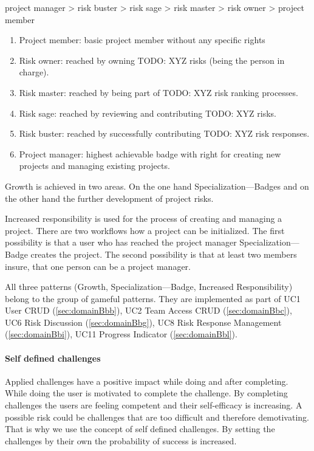 project manager > risk buster > risk sage > risk master > risk owner > project member

\begin{enumerate}
	\item Project member: basic project member without any specific rights
	\item Risk owner: reached by owning TODO: XYZ risks (being the person in charge).
	\item Risk master: reached by being part of TODO: XYZ risk ranking processes.
	\item Risk sage: reached by reviewing and contributing TODO: XYZ risks.
	\item Risk buster: reached by successfully contributing TODO: XYZ risk responses.
	\item Project manager: highest achievable badge with right for creating new projects and managing existing projects.
\end{enumerate}

Growth is achieved in two areas. On the one hand Specialization—Badges and on the other hand the further development of project risks.

Increased responsibility is used for the process of creating and managing a project. There are two workflows how a project can be initialized. The first possibility is that a user who has reached the project manager Specialization—Badge creates the project. The second possibility is that at least two members insure, that one person can be a project manager.

All three patterns (Growth, Specialization—Badge, Increased Responsibility) belong to the group of gameful patterns.
They are implemented as part of \ac{UC}1 User CRUD (\ref{sec:domainBbb}), \ac{UC}2 Team Access CRUD (\ref{sec:domainBbc}), \ac{UC}6 Risk Discussion (\ref{sec:domainBbg}), \ac{UC}8 Risk Response Management (\ref{sec:domainBbi}), \ac{UC}11 Progress Indicator (\ref{sec:domainBbl}).

\paragraph*{Self defined challenges}

Applied challenges have a positive impact while doing and after completing. While doing the user is motivated to complete the challenge. By completing challenges the users are feeling competent and their self-efficacy is increasing. A possible risk could be challenges that are too difficult and therefore demotivating. That is why we use the concept of self defined challenges. By setting the challenges by their own the probability of success is increased.

